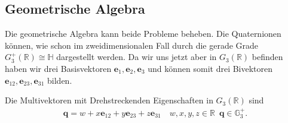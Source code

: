 \subsection{Geometrische Algebra}
Die geometrische Algebra kann beide Probleme beheben. Die Quaternionen können, wie schon im zweidimensionalen Fall durch die gerade Grade $G_3^+(\mathbb{R}) \cong \mathbb{H}$ dargestellt werden. Da wir uns jetzt aber in $G_3(\mathbb{R})$ befinden haben wir drei Basisvektoren $\mathbf{e}_1, \mathbf{e}_2, \mathbf{e}_3$ und können somit drei Bivektoren $\mathbf{e}_{12}, \mathbf{e}_{23}, \mathbf{e}_{31}$ bilden.
\begin{definition}
	Die Multivektoren mit Drehstreckenden Eigenschaften in $G_3(\mathbb{R})$ sind
	\begin{align}
		\mathbf{q} = w + x\mathbf{e}_{12} + y\mathbf{e}_{23} + z\mathbf{e}_{31} \quad w,x,y,z \in \mathbb{R}\enspace \mathbf{q} \in \mathbb{G}_3^+.
	\end{align}
\end{definition}

